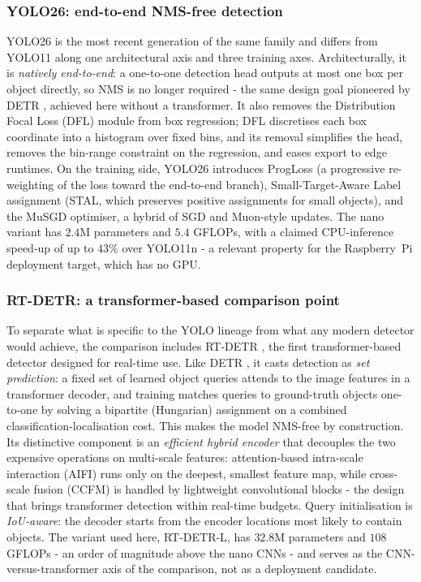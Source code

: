 \subsubsection{YOLO26: end-to-end NMS-free detection}

YOLO26 \cite{Ultralytics2025yolo26} is the most recent generation of the same
family and differs from YOLO11 along one architectural axis and three training
axes. Architecturally, it is \emph{natively end-to-end}: a one-to-one detection
head outputs at most one box per object directly, so NMS is no longer required
- the same design goal pioneered by DETR \cite{Carion2020detr}, achieved here
without a transformer. It also removes the Distribution Focal Loss (DFL) module
from box regression; DFL discretises each box coordinate into a histogram over
fixed bins, and its removal simplifies the head, removes the bin-range
constraint on the regression, and eases export to edge runtimes. On the
training side, YOLO26 introduces ProgLoss (a progressive re-weighting of the
loss toward the end-to-end branch), Small-Target-Aware Label assignment (STAL,
which preserves positive assignments for small objects), and the MuSGD
optimiser, a hybrid of SGD and Muon-style updates. The nano variant has $2.4$M
parameters and $5.4$ GFLOPs, with a claimed CPU-inference speed-up of up to
$43\%$ over YOLO11n \cite{Ultralytics2025yolo26} - a relevant property for the
Raspberry~Pi deployment target, which has no GPU.

\subsubsection{RT-DETR: a transformer-based comparison point}

To separate what is specific to the YOLO lineage from what any modern detector
would achieve, the comparison includes RT-DETR \cite{Lv2024rtdetr}, the first
transformer-based detector designed for real-time use. Like DETR
\cite{Carion2020detr}, it casts detection as \emph{set prediction}: a fixed set
of learned object queries attends to the image features in a transformer
decoder, and training matches queries to ground-truth objects one-to-one by
solving a bipartite (Hungarian) assignment on a combined
classification-localisation cost. This makes the model NMS-free by
construction. Its distinctive component is an \emph{efficient hybrid encoder}
that decouples the two expensive operations on multi-scale features:
attention-based intra-scale interaction (AIFI) runs only on the deepest,
smallest feature map, while cross-scale fusion (CCFM) is handled by lightweight
convolutional blocks - the design that brings transformer detection within
real-time budgets. Query initialisation is \emph{IoU-aware}: the decoder starts
from the encoder locations most likely to contain objects. The variant used
here, RT-DETR-L, has $32.8$M parameters and $108$ GFLOPs - an order of
magnitude above the nano CNNs - and serves as the CNN-versus-transformer axis
of the comparison, not as a deployment candidate.

